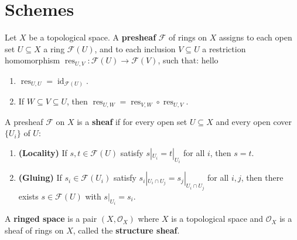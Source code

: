 


\section{Schemes}

\begin{definition}
    \label{def:presheaf}
    \notready
    Let $X$ be a topological space. A \textbf{presheaf} $\mathcal{F}$ of rings on $X$ assigns to each open set $U \subseteq X$ a ring $\mathcal{F}(U)$, and to each inclusion $V \subseteq U$ a restriction homomorphism $\operatorname{res}_{U,V} \colon \mathcal{F}(U) \to \mathcal{F}(V)$, such that: hello
    \begin{enumerate}
        \item $\operatorname{res}_{U,U} = \operatorname{id}_{\mathcal{F}(U)}$.
        \item If $W \subseteq V \subseteq U$, then $\operatorname{res}_{U,W} = \operatorname{res}_{V,W} \circ \operatorname{res}_{U,V}$.
    \end{enumerate}
\end{definition}

\begin{definition}[Sheaf]
    \label{def:sheaf}
    \notready
    A presheaf $\mathcal{F}$ on $X$ is a \textbf{sheaf} if for every open set $U \subseteq X$ and every open cover $\{U_i\}$ of $U$:
    \begin{enumerate}
        \item \textbf{(Locality)} If $s, t \in \mathcal{F}(U)$ satisfy $s|_{U_i} = t|_{U_i}$ for all $i$, then $s = t$.
        \item \textbf{(Gluing)} If $s_i \in \mathcal{F}(U_i)$ satisfy $s_i|_{U_i \cap U_j} = s_j|_{U_i \cap U_j}$ for all $i, j$, then there exists $s \in \mathcal{F}(U)$ with $s|_{U_i} = s_i$.
    \end{enumerate}
\end{definition}

\begin{definition}
    \label{def:ringed-space}
    \notready
    A \textbf{ringed space} is a pair $(X, \mathcal{O}_X)$ where $X$ is a topological space and $\mathcal{O}_X$ is a sheaf of rings on $X$, called the \textbf{structure sheaf}.
\end{definition}

